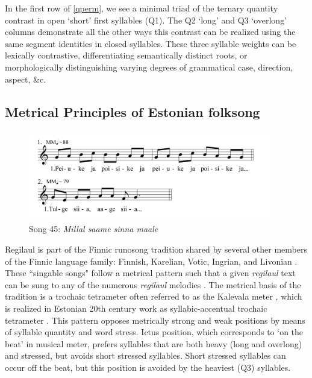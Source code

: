 In the first row of \ref{qperm}, we see a minimal triad of the ternary quantity contrast in open `short' first syllables (Q1). The Q2 `long' and Q3 `overlong' columns demonstrate all the other ways this contrast can be realized using the same segment identities in closed syllables. These three syllable weights can be lexically contrastive, differentiating semantically distinct roots, or morphologically distinguishing varying degrees of grammatical case, direction, aspect, \&c. 



\subsection{Metrical Principles of Estonian folksong}



\begin{figure}[ht]
\begin{center}
\includegraphics[width=300pt]{figures/045.png}
\caption{Song 45: {\it Millal saame sinna maale}}
\label{045}
\end{center}
\end{figure}

Regilaul is part of the Finnic runosong tradition shared by several other members of the Finnic language family: Finnish, Karelian, Votic, Ingrian, and Livonian \citep{rossLehiste2001}. These ``singable songs" \citep{tormis1985} follow a metrical pattern such that a given {\it regilaul} text can be sung to any of the numerous {\it regilaul} melodies \citep{rossLehiste2001}. The metrical basis of the tradition is a trochaic tetrameter often referred to as the Kalevala meter \citep{oras2019}, which is realized in Estonian 20th century work as syllabic-accentual trochaic tetrameter \citep{lotmanLotman2013}. This pattern opposes metrically strong and weak positions by means of syllable quantity and word stress. Ictus position, which corresponds to `on the beat' in musical meter, prefers syllables that are both heavy (long and overlong) and stressed, but avoids short stressed syllables. Short stressed syllables can occur off the beat, but this position is avoided by the heaviest (Q3) syllables. 

